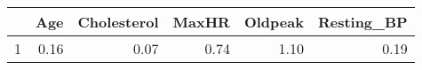 \begin{table}[ht]
\centering
\begin{tabular}{rrrrrr}
  \hline
 & Age & Cholesterol & MaxHR & Oldpeak & Resting\_BP \\ 
  \hline
1 & 0.16 & 0.07 & 0.74 & 1.10 & 0.19 \\ 
   \hline
\end{tabular}
\end{table}

